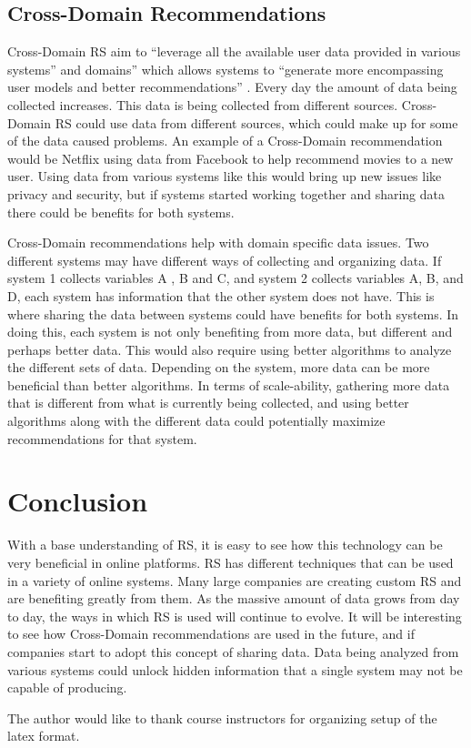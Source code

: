 \documentclass[sigconf]{acmart}
\begin{document}
\subsection{Cross-Domain Recommendations}
Cross-Domain RS aim to ``leverage all the available user data provided in various systems''  and
domains'' which allows systems to ``generate more encompassing user models and better recommendations'' \cite{Cantador2015}. 
Every day the amount of data being collected increases. This data is being collected from different sources. 
Cross-Domain RS could use data from different sources, which could make up for some of the data caused
problems. An example of a Cross-Domain recommendation would be Netflix using data from Facebook to help
recommend movies to a new user. Using data from various systems like this would bring up new issues like
privacy and security, but if systems started working together and sharing data there could be benefits for both
systems. 

Cross-Domain recommendations help with domain specific data issues. Two different systems may have different
ways of collecting and organizing data. If system 1 collects variables A , B and C, and system 2 collects
variables A, B, and D, each system has information that the other system does not have. This is where sharing
the data between systems could have benefits for both systems. In doing this, each system is not only
benefiting from more data, but different and perhaps better data. This would also require using better
algorithms to analyze the different sets of data. Depending on the system, more data  can be more beneficial
than better algorithms. In terms of scale-ability, gathering more data that is different from what is currently
being collected, and using better algorithms along with the different data could potentially maximize
recommendations for that system. 

\section{Conclusion}
With a base understanding of RS, it is easy to see how this technology can be very beneficial in online
platforms. RS has different techniques that can be used in a variety of online systems.  Many large companies
are creating custom RS and are benefiting greatly from them. As the massive amount of data grows from day to
day, the ways in which RS is used will continue to evolve. It will be interesting to see how Cross-Domain
recommendations are used in the future, and if companies start to adopt this concept of sharing data. Data
being analyzed from various systems could unlock hidden information that a single system may not be capable of
producing.  
\begin{acks}

  The author would like to thank course instructors for organizing setup of the latex format. 

\end{acks}


 
\end{document}
